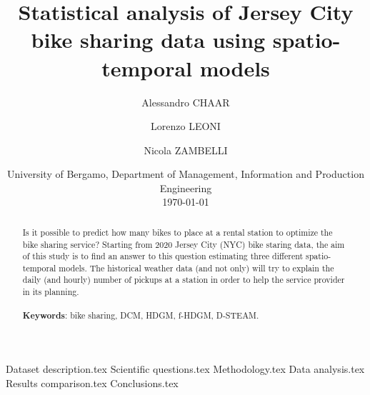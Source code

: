 \documentclass[a4paper, 12pt, one column, aas_macros]{article}
\title{Statistical analysis of Jersey City bike sharing data using spatio-temporal models}
\author{Alessandro CHAAR \and Lorenzo LEONI \and Nicola ZAMBELLI}
\date{%
	University of Bergamo, Department of Management, Information and Production Engineering\\[2ex]%
	\today
}
\begin{document}
	\maketitle
	
	\begin{abstract}
		Is it possible to predict how many bikes to place at a rental station to optimize the bike sharing service? Starting from \num{2020} Jersey City (NYC) bike staring data, the aim of this study is to find an answer to this question estimating three different spatio-temporal models. The historical weather data (and not only) will try to explain the daily (and hourly) number of pickups at a station in order to help the service provider in its planning. \\\\
		\textbf{Keywords}: bike sharing, DCM, HDGM, f-HDGM, D-STEAM.
	\end{abstract}
	
	{Dataset description.tex}
	{Scientific questions.tex}
	{Methodology.tex}
	{Data analysis.tex}
	{Results comparison.tex}
	{Conclusions.tex}

	\newpage
	
	
	\listoftables
\end{document}
